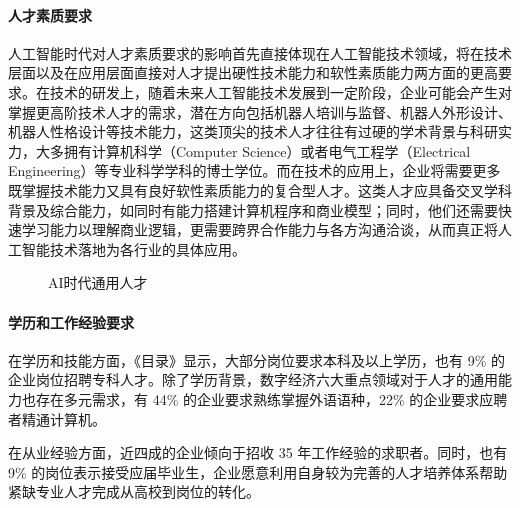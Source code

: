\documentclass[letterpaper,11pt,english]{sphinxmanual}
\begin{document}
\paragraph{人才素质要求}
\label{\detokenize{chapter_project/AI_talents:id13}}
人工智能时代对人才素质要求的影响首先直接体现在人工智能技术领域，将在技术层面以及在应用层面直接对人才提出硬性技术能力和软性素质能力两方面的更高要求。在技术的研发上，随着未来人工智能技术发展到一定阶段，企业可能会产生对掌握更高阶技术人才的需求，潜在方向包括机器人培训与监督、机器人外形设计、机器人性格设计等技术能力，这类顶尖的技术人才往往有过硬的学术背景与科研实力，大多拥有计算机科学（Computer
Science）或者电气工程学（Electrical
Engineering）等专业科学学科的博士学位。而在技术的应用上，企业将需要更多既掌握技术能力又具有良好软性素质能力的复合型人才。这类人才应具备交叉学科背景及综合能力，如同时有能力搭建计算机程序和商业模型；同时，他们还需要快速学习能力以理解商业逻辑，更需要跨界合作能力与各方沟通洽谈，从而真正将人工智能技术落地为各行业的具体应用。
%
\begin{footnote}[674]\sphinxAtStartFootnote
{}
%
\end{footnote}

\begin{figure}[H]
\centering
\capstart

\noindent{}
\caption{AI时代通用人才\sphinxfootnotemark[675]}\label{\detokenize{chapter_project/AI_talents:id22}}\end{figure}
%
\begin{footnotetext}[675]\sphinxAtStartFootnote
{}
%
\end{footnotetext}\ignorespaces 

\paragraph{学历和工作经验要求}
\label{\detokenize{chapter_project/AI_talents:id14}}
在学历和技能方面，《目录》显示，大部分岗位要求本科及以上学历，也有 9\%
的企业岗位招聘专科人才。除了学历背景，数字经济六大重点领域对于人才的通用能力也存在多元需求，有
44\% 的企业要求熟练掌握外语语种，22\% 的企业要求应聘者精通计算机。

在从业经验方面，近四成的企业倾向于招收 3\sphinxhyphen{}5
年工作经验的求职者。同时，也有 9\%
的岗位表示接受应届毕业生，企业愿意利用自身较为完善的人才培养体系帮助紧缺专业人才完成从高校到岗位的转化。%
\begin{footnote}[676]\sphinxAtStartFootnote
{}
%
\end{footnote}
\end{document}

